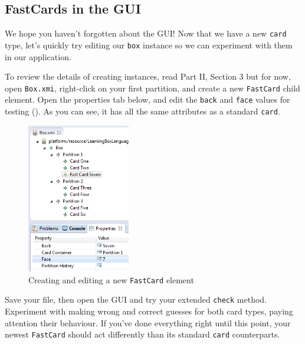 \newpage
\hypertarget{subsec:fastGUI}{}
\subsection{FastCards in the GUI}
\genHeader

We hope you haven't forgotten about the GUI! Now that we have a new \texttt{card} type, let's quickly try editing our \texttt{box} instance so we can experiment
with them in our application.

\begin{stepbystep}
  
\item To review the details of creating instances, read Part II, Section 3 but for now, open \texttt{Box.xmi}, right-click on your
first partition, and create a new \texttt{FastCard} child element. Open the properties tab below, and edit the \texttt{back} and \texttt{face} values for
testing (). As you can see, it has all the same attributes as a standard \texttt{card}.

\vspace{0.5cm}

\begin{figure}[htbp]
\begin{center}
  \includegraphics[width=0.4\textwidth]{../../org.moflon.doc.handbook.03_storyDiagrams/11_fastCards/eclipse_fastCardProperties}
  \caption{Creating and editing a new \texttt{FastCard} element}  
  \label{eclipse:fastCardProperties}
\end{center}
\end{figure}

\item Save your file, then open the GUI and try your extended \texttt{check} method. Experiment with making wrong and correct
guesses for both card types, paying attention their behaviour. If you've done everything right until this point, your newest \texttt{FastCard} should act
differently than its standard \texttt{card} counterparts.

\end{stepbystep}
